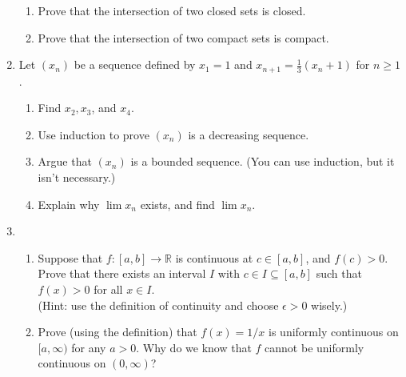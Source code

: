 \documentclass[12pt]{article}
\newcommand{\points}[1]{\marginpar{\hspace{24pt}[#1]}}
\newcommand{\R}{\mathbb{R}}
\begin{document}
\begin{enumerate}
\begin{enumerate}
\item Prove that the intersection of two closed sets is closed. \points{3}\\


\vspace{2.5in}

\item Prove that the intersection of two compact sets is compact.\points{3}

      \end{enumerate}

\newpage

\item Let $(x_n)$ be a sequence defined by $x_1=1$ and $x_{n+1} = \frac{1}{3}(x_n+1)$ for $n\geq 1$.
\begin{enumerate}
\item Find $x_2, x_3$, and $x_4$. \points{2}

\vspace{1.25in}

\item Use induction to prove $(x_n)$ is a decreasing sequence. \points{4}

\vspace{2.75in}

\item Argue that $(x_n)$ is a bounded sequence. (You can use induction, but it isn't necessary.) \points{2}

\vspace{2in}

\item Explain why $\lim x_n$ exists, and find $\lim x_n$. \points{2}

\end{enumerate}
\newpage

\item \begin{enumerate}
       \item Suppose that $f:[a,b]\to\R$ is continuous at $c\in [a,b]$, and $f(c)>0$. Prove that there exists an interval $I$ with $c\in I\subseteq [a,b]$ such that $f(x)>0$ for all $x\in I$.  \points{5}\\
(Hint: use the definition of continuity and choose $\epsilon>0$ wisely.)

\vspace{4in}

       \item Prove (using the definition) that $f(x)=1/x$ is uniformly continuous on $[a,\infty)$ for any $a>0$. \points{5} Why do we know that $f$ cannot be uniformly continuous on $(0,\infty)$?
      \end{enumerate}
\newpage


\end{enumerate}
\end{document}
